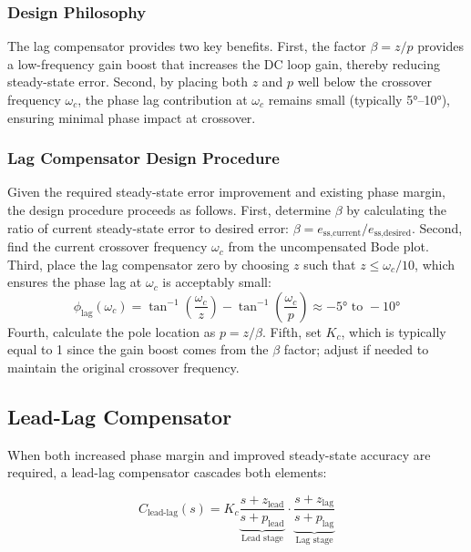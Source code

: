\subsubsection{Design Philosophy}

The lag compensator provides two key benefits. First, the factor $\beta = z/p$ provides a low-frequency gain boost that increases the DC loop gain, thereby reducing steady-state error. Second, by placing both $z$ and $p$ well below the crossover frequency $\omega_c$, the phase lag contribution at $\omega_c$ remains small (typically 5°--10°), ensuring minimal phase impact at crossover.

\subsubsection{Lag Compensator Design Procedure}

Given the required steady-state error improvement and existing phase margin, the design procedure proceeds as follows. First, determine $\beta$ by calculating the ratio of current steady-state error to desired error: $\beta = e_{\text{ss,current}}/e_{\text{ss,desired}}$. Second, find the current crossover frequency $\omega_c$ from the uncompensated Bode plot. Third, place the lag compensator zero by choosing $z$ such that $z \leq \omega_c / 10$, which ensures the phase lag at $\omega_c$ is acceptably small:
\begin{equation}
\phi_{\text{lag}}(\omega_c) = \tan^{-1}\left(\frac{\omega_c}{z}\right) - \tan^{-1}\left(\frac{\omega_c}{p}\right) \approx -5° \text{ to } -10°
\end{equation}
Fourth, calculate the pole location as $p = z/\beta$. Fifth, set $K_c$, which is typically equal to 1 since the gain boost comes from the $\beta$ factor; adjust if needed to maintain the original crossover frequency.

\subsection{Lead-Lag Compensator}

When both increased phase margin and improved steady-state accuracy are required, a lead-lag compensator cascades both elements:

\begin{equation}
\boxed{C_{\text{lead-lag}}(s) = K_c \underbrace{\frac{s + z_{\text{lead}}}{s + p_{\text{lead}}}}_{\text{Lead stage}} \cdot \underbrace{\frac{s + z_{\text{lag}}}{s + p_{\text{lag}}}}_{\text{Lag stage}}}
\label{eq:lead_lag}
\end{equation}

